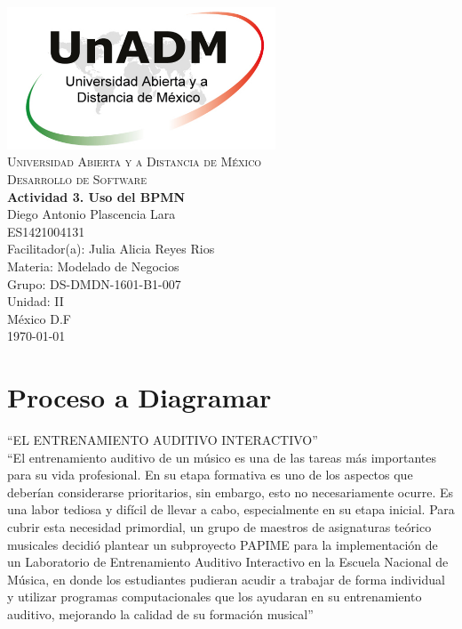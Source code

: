 \documentclass[spanish,12pt,letterpapper]{article}
\begin{document}
	\begin{titlepage}
		\begin{center}
			\includegraphics[width=0.6\textwidth]{../logoUnADM}~\\[1cm] 
			\textsc{Universidad Abierta y a Distancia de México}\\[0.8cm]
			\textsc{Desarrollo de Software}\\[1.8cm]
			
			\textbf{ \Large Actividad 3. Uso del BPMN}\\[3cm]
			
			Diego Antonio Plascencia Lara\\ ES1421004131 \\[0.4cm]
			Facilitador(a): Julia Alicia Reyes Rios\\
			Materia: Modelado de Negocios\\
			Grupo: DS-DMDN-1601-B1-007 \\
			Unidad: II \\
			
			\vfill México D.F\\{\today}
			
		\end{center}
	\end{titlepage}
	
	\section{Proceso a Diagramar}
	
	``EL ENTRENAMIENTO AUDITIVO INTERACTIVO''\\
	
	``El entrenamiento auditivo de un músico es una de las tareas más importantes para su vida profesional. En su etapa formativa es uno de los aspectos que deberían considerarse prioritarios, sin embargo, esto no necesariamente ocurre. Es una labor tediosa y difícil de llevar a cabo, especialmente en su etapa inicial. Para cubrir esta necesidad primordial, un grupo de maestros de asignaturas teórico musicales decidió plantear un subproyecto PAPIME para la implementación de un Laboratorio de Entrenamiento Auditivo Interactivo en la Escuela Nacional de Música, en donde los estudiantes pudieran acudir a trabajar de forma individual y utilizar programas computacionales que los ayudaran en su entrenamiento auditivo, mejorando la calidad de su formación musical''
	
\end{document}
